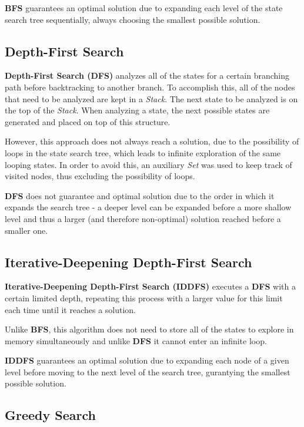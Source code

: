 \documentclass[conference]{IEEEtran}
\begin{document}
\textbf{BFS} guarantees an optimal solution due to expanding each level of the state search tree sequentially, always choosing the smallest possible solution.

\subsection{Depth-First Search}

\textbf{Depth-First Search (DFS)} analyzes all of the states for a certain branching path before backtracking to another branch. To accomplish this, all of the nodes that need to be analyzed are kept in a \textit{Stack}. The next state to be analyzed is on the top of the \textit{Stack}. When analyzing a state, the next possible states are generated and placed on top of this structure.

However, this approach does not always reach a solution, due to the possibility of loops in the state search tree, which leads to infinite exploration of the same looping states.
In order to avoid this, an auxiliary \textit{Set} was used to keep track of visited nodes, thus excluding the possibility of loops.

\textbf{DFS} does not guarantee and optimal solution due to the order in which it expands the search tree - a deeper level can be expanded before a more shallow level and thus a larger (and therefore non-optimal) solution reached before a smaller one.

\subsection{Iterative-Deepening Depth-First Search}

\textbf{Iterative-Deepening Depth-First Search (IDDFS)} executes a \textbf{DFS} with a certain limited depth, repeating this process with a larger value for this limit each time until it reaches a solution.

Unlike \textbf{BFS}, this algorithm does not need to store all of the states to explore in memory simultaneously and unlike \textbf{DFS} it cannot enter an infinite loop.

\textbf{IDDFS} guarantees an optimal solution due to expanding each node of a given level before moving to the next level of the search tree, gurantying the smallest possible solution.

\subsection{Greedy Search}
\end{document}

